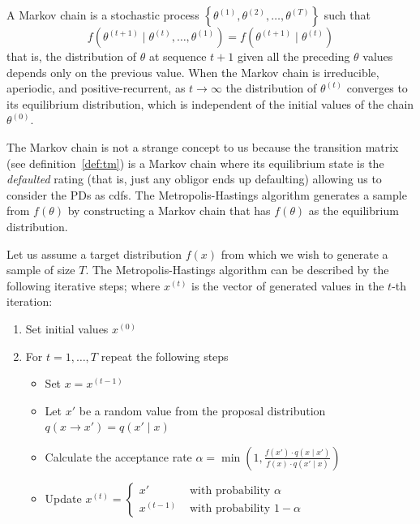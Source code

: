 \documentclass[11pt,fleqn]{book} %
\begin{document}
\begin{definition}
	A Markov chain is a stochastic process 
	$\left\{\theta^{(1)},\theta^{(2)},\dots,\theta^{(T)}\right\}$ such that
	\begin{displaymath}
		f\left(\theta^{(t+1)} \mid \theta^{(t)},\dots,\theta^{(1)}\right) = 
		f\left(\theta^{(t+1)} \mid \theta^{(t)}\right)
	\end{displaymath}
	that is, the distribution of $\theta$ at sequence $t+1$ given all the 
	preceding $\theta$ values depends only on the previous value. 
	When the Markov chain is irreducible, aperiodic, and positive-recurrent, 
	as $t \to \infty$ the distribution of $\theta^{(t)}$ converges to its 
	equilibrium distribution, which is independent of the initial values 
	of the chain $\theta^{(0)}$.
\end{definition}

The Markov chain is not a strange concept to us because the transition 
matrix (see definition~\ref{def:tm}) is a Markov chain where its 
equilibrium state is the \emph{defaulted} rating (that is, just any 
obligor ends up defaulting) allowing us to consider the PDs as cdfs.
The Metropolis-Hastings algorithm generates a sample from $f(\theta)$ 
by constructing a Markov chain that has $f(\theta)$ as the equilibrium 
distribution.

\begin{algorithm}
	Let us assume a target distribution $f(x)$ from which we wish to 
	generate a sample of size $T$. The Metropolis-Hastings algorithm can 
	be described by the following iterative steps; where $x^{(t)}$ is the 
	vector of generated values in the $t$-th iteration:
	\begin{enumerate}
		\item Set initial values $x^{(0)}$
		\item For $t=1,\dots,T$ repeat the following steps
		\begin{itemize}
			\item Set $x=x^{(t-1)}$
			\item Let $x'$ be a random value from the proposal distribution 
			$q(x \to x')=q(x' \mid x)$
			\item Calculate the acceptance rate 
			$\alpha = \min\left(1,\frac{f(x') \cdot q(x \mid x')}{f(x) \cdot q(x' \mid x)}\right)$
			\item Update $x^{(t)}=\left\{
			\begin{array}{ll}
				x'        & \text{ with probability } \alpha   \\
				x^{(t-1)} & \text{ with probability } 1-\alpha 
			\end{array}\right.$ 
		\end{itemize}
	\end{enumerate}
\end{algorithm}
\end{document}
